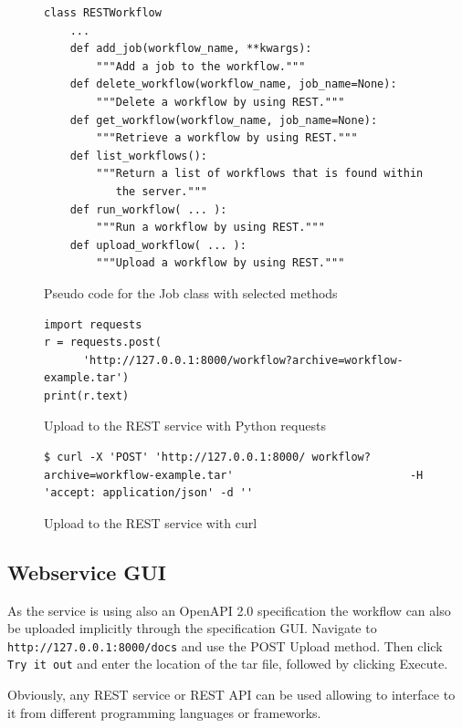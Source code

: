 \begin{figure}[t]
\begin{verbatim}
class RESTWorkflow
    ...
    def add_job(workflow_name, **kwargs):
        """Add a job to the workflow."""
    def delete_workflow(workflow_name, job_name=None):
        """Delete a workflow by using REST."""
    def get_workflow(workflow_name, job_name=None):
        """Retrieve a workflow by using REST."""
    def list_workflows():
        """Return a list of workflows that is found within
           the server."""
    def run_workflow( ... ):
        """Run a workflow by using REST."""
    def upload_workflow( ... ):
        """Upload a workflow by using REST."""
\end{verbatim}
\caption{Pseudo code for the Job class with selected methods}
\label{fig:code-workflow-rest-commandline}

\bigskip

\begin{verbatim}
import requests
r = requests.post(
      'http://127.0.0.1:8000/workflow?archive=workflow-example.tar')
print(r.text)
\end{verbatim}
\caption{Upload to the REST service with Python requests}
\label{fig:code-workflow-requests}

\bigskip

\begin{verbatim}
$ curl -X 'POST' 'http://127.0.0.1:8000/ workflow?archive=workflow-example.tar'                           -H 'accept: application/json' -d ''
\end{verbatim}
\caption{Upload to the REST service with curl}
\label{fig:code-workflow-curl}

\end{figure}


\subsection{Webservice GUI}

As the service is using also an OpenAPI 2.0 specification the workflow
can also be uploaded implicitly through the specification
GUI. Navigate to \texttt{http://127.0.0.1:8000/docs} and use the POST
Upload method.  Then click \texttt{Try\ it\ out} and enter the
location of the tar file, followed by clicking Execute.

Obviously, any REST service or REST API can be used allowing to
interface to it from different programming languages or frameworks.

